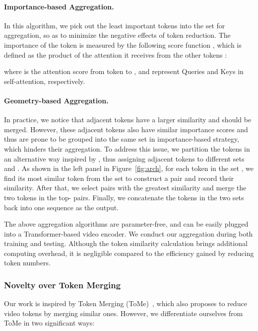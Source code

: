 \documentclass[11pt]{article}
\begin{document}
\paragraph{Importance-based Aggregation.}
In this algorithm, we pick out the least important  tokens into the set  for aggregation, so as to minimize the negative effects of token reduction. 
The importance of the token  is measured by the following score function , which is defined as the product of the attention it receives from the other tokens :

where  is the attention score from token  to ,  and  represent Queries and Keys in self-attention, respectively.


\paragraph{Geometry-based Aggregation.}
In practice, we notice that adjacent tokens have a larger similarity and should be merged. However, these adjacent tokens also have similar importance scores and thus are prone to be grouped into the same set in importance-based strategy, which hinders their aggregation. 
To address this issue, we partition the  tokens in an alternative way inspired by \citet{Bolya2022TokenMY}, thus assigning adjacent tokens to different sets  and . 
As shown in the left panel in Figure~\ref{fig:arch}, for each token  in the set , we find its most similar token  from the set  to construct a pair  and record their similarity. 
After that, we select  pairs with the greatest similarity and merge the two tokens in the top- pairs. 
Finally, we concatenate the tokens in the two sets back into one sequence as the output.  

The above aggregation algorithms are parameter-free, and can be easily plugged into a Transformer-based video encoder. 
We conduct our aggregation during both training and testing. 
Although the token similarity calculation brings additional computing overhead, it is negligible compared to the efficiency gained by reducing token numbers. 


\subsubsection{Novelty over Token Merging}
\label{subsubsec:novelty-over-tome}
Our work is inspired by Token Merging (ToMe)~\citep{Bolya2022TokenMY}, which also proposes to reduce video tokens by merging similar ones. 
However, we differentiate ourselves from ToMe in two significant ways:
\end{document}
